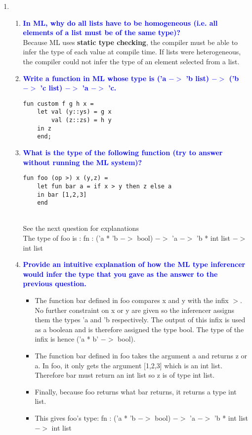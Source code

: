 \documentclass[10pt]{article}
\begin{document}
\begin{enumerate}
    
    \item
    \begin{enumerate}
        \item \textbf{\textcolor{blue}{In ML, why do all lists have to be homogeneous (i.e. all elements of a list must be of the same type)?}}
            \\ Because ML uses \textbf{static type checking}, the compiler must be able to infer the type of each value at compile time. If lists were heterogeneous, the compiler could not infer the type of an element selected from a list.
        \item \textbf{\textcolor{blue}{Write a function in ML whose type is ('a $->$ 'b list) $->$ ('b $->$ 'c list) $->$ 'a $->$ 'c.}}
            \begin{verbatim}
fun custom f g h x = 
    let val (y::ys) = g x
        val (z::zs) = h y
    in z
    end;
            \end{verbatim}
        \item \textbf{\textcolor{blue}{What is the type of the following function (try to answer without running the ML
        system)?}}
        \begin{verbatim}
fun foo (op >) x (y,z) =
    let fun bar a = if x > y then z else a
    in bar [1,2,3]
    end
        \end{verbatim}
            \\ See the next question for explanations
            \\ The type of foo is : fn : ('a * 'b $->$ bool) $->$ 'a $->$ 'b * int list $->$ int list
        \item \textbf{\textcolor{blue}{Provide an intuitive explanation of how the ML type inferencer would infer the type that you gave as the answer to the previous question.}}
            \begin{itemize}
                \item The function bar defined in foo compares x and y with the infix $>$. No further constraint on x or y are given so the inferencer assigns them the types 'a and 'b respectively. The output of this infix is used as a boolean and is therefore assigned the type bool. The type of the infix is hence ('a * b' $->$ bool).
                \item The function bar defined in foo takes the argument a and returns z or a. In foo, it only gets the argument [1,2,3] which is an int list. Therefore bar must return an int list so z is of type int list.
                \item Finally, because foo returns what bar returns, it returns a type int list.
                \item This gives foo's type: fn : ('a * 'b $->$ bool) $->$ 'a $->$ 'b * int list $->$ int list
            \end{itemize}      
    \end{enumerate}
    

\end{enumerate}
\end{document}
